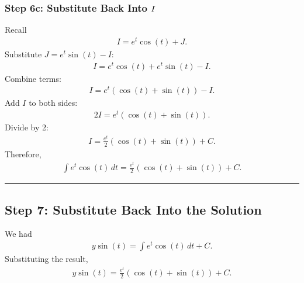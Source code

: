 \documentclass[letterpaper,10pt,english]{sphinxmanual}
\begin{document}
\subsubsection{Step 6c: Substitute Back Into \protect\(I\protect\)}
\label{\detokenize{Language/Science_language/ODE_calculus/course_MATH_3035/homework_assignments/index_pdf:step-6c-substitute-back-into-i}}
\sphinxAtStartPar
Recall
\begin{equation*}
\begin{split}I=e^t\cos(t)+J.\end{split}
\end{equation*}
\sphinxAtStartPar
Substitute \(J=e^t\sin(t)-I\):
\begin{equation*}
\begin{split}I=e^t\cos(t)+e^t\sin(t)-I.\end{split}
\end{equation*}
\sphinxAtStartPar
Combine terms:
\begin{equation*}
\begin{split}I=e^t(\cos(t)+\sin(t))-I.\end{split}
\end{equation*}
\sphinxAtStartPar
Add \(I\) to both sides:
\begin{equation*}
\begin{split}2I=e^t(\cos(t)+\sin(t)).\end{split}
\end{equation*}
\sphinxAtStartPar
Divide by 2:
\begin{equation*}
\begin{split}I=\frac{e^t}{2}(\cos(t)+\sin(t))+C.\end{split}
\end{equation*}
\sphinxAtStartPar
Therefore,
\begin{equation*}
\begin{split}\boxed{
\int e^t\cos(t)\,dt
=
\frac{e^t}{2}
(\cos(t)+\sin(t))
+C
}.\end{split}
\end{equation*}

\bigskip\hrule\bigskip



\subsection{Step 7: Substitute Back Into the Solution}
\label{\detokenize{Language/Science_language/ODE_calculus/course_MATH_3035/homework_assignments/index_pdf:step-7-substitute-back-into-the-solution}}
\sphinxAtStartPar
We had
\begin{equation*}
\begin{split}y\sin(t)
=
\int e^t\cos(t)\,dt + C.\end{split}
\end{equation*}
\sphinxAtStartPar
Substituting the result,
\begin{equation*}
\begin{split}y\sin(t)
=
\frac{e^t}{2}
(\cos(t)+\sin(t))
+C.\end{split}
\end{equation*}
\end{document}
